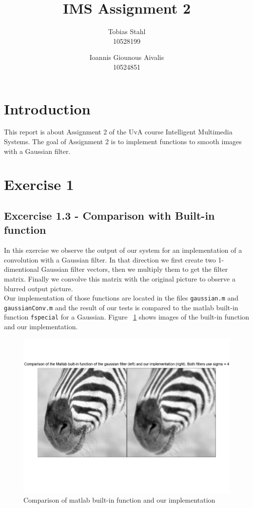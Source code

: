 \documentclass[11pt]{article}
\title{
	\textbf{IMS Assignment 2}
}
\author{Tobias Stahl \\ 10528199 \and Ioannis Giounous Aivalis \\ 10524851 }
\begin{document}
\maketitle

\section{Introduction}
This report is about Assignment 2 of the UvA course Intelligent Multimedia Systems. The goal of Assignment 2 is to implement functions to smooth images with a Gaussian filter.

\section{Exercise 1}

\subsection{Excercise 1.3 - Comparison with Built-in function}
In this exercise we observe the output of our system for an implementation of a convolution with a Gaussian filter. In that direction we first create two 1-dimentional Gaussian filter vectors, then we multiply them to get the filter matrix. Finally we convolve this matrix with the original picture to observe a blurred output picture.\\
Our implementation of those functions are located in the files \texttt{gaussian.m} and \texttt{gaussianConv.m} and the result of our tests is compared to the matlab built-in function \texttt{fspecial} for a Gaussian. Figure ~\ref{comp} shows images of the built-in function and our implementation.
\begin{figure}[h!]
\includegraphics[scale=0.6]{comparison.png}
\caption{Comparison of matlab built-in function and our implementation }
\label{comp}
\end{figure}
\end{document}
